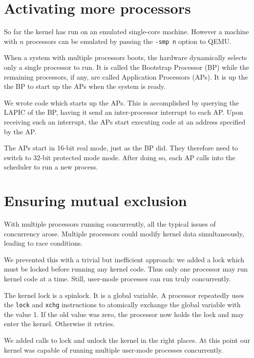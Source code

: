 \documentclass{report}
\begin{document}
\section{Activating more processors}
\label{sec:moreprocs}
So far the kernel has run on an emulated single-core machine. However a
machine with $n$ processors can be emulated by passing the \texttt{-smp n}
option to QEMU.

When a system with multiple processors boots, the hardware dynamically selects
only a single processor to run. It is called the Bootstrap Processor (BP)
while the remaining processors, if any, are called Application Processors
(APs). It is up the the BP to start up the APs when the system is ready.

We wrote code which starts up the APs. This is accomplished by querying the
LAPIC of the BP, having it send an inter-processor interrupt to each AP. Upon
receiving such an interrupt, the APs start executing code at an address
specified by the AP.

The APs start in 16-bit real mode, just as the BP did. They therefore need to
switch to 32-bit protected mode mode. After doing so, each AP calls into the
scheduler to run a new process.




\section{Ensuring mutual exclusion}
With multiple processors running concurrently, all the typical issues of
concurrency arose. Multiple processors could modify kernel data
simultaneously, leading to race conditions.

We prevented this with a trivial but inefficient approach: we added a lock
which must be locked before running any kernel code. Thus only one processor
may run kernel code at a time. Still, user-mode processes can run truly
concurrently.

The kernel lock is a spinlock. It is a global variable. A processor repeatedly
uses the \texttt{lock} and \texttt{xchg} instructions to atomically exchange
the global variable with the value 1. If the old value was zero, the processor
now holds the lock and may enter the kernel. Otherwise it retries.

We added calls to lock and unlock the kernel in the right places. At this
point our kernel was capable of running multiple user-mode processes
concurrently.
\end{document}
